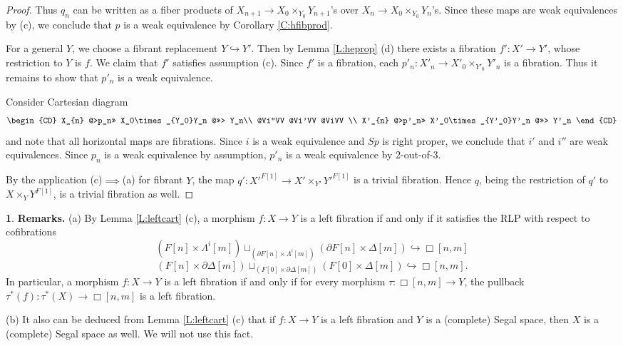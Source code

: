\documentclass[12pt]{amsart}
\theoremstyle{plain}
\theoremstyle{definition}
\newtheorem{Emp}[Thm]{}
\numberwithin{equation}{section}
\newcommand{\La}{\Lambda}
\newcommand{\hra}{\hookrightarrow}
\newcommand{\Dt}{\Delta}
\newcommand{\rl}[1]{Lemma \ref{L:#1}}
\newcommand{\rco}[1]{Corollary \ref{C:#1}}
\begin{document}
\begin{proof}
Thus $q_n$ can be written as a fiber products of $X_{n+1}\to
X_0\times_{Y_0}Y_{n+1}$'s over $X_n\to X_0\times_{Y_0}Y_n$'s. Since
these maps are weak equivalences by (c), we conclude that $p$ is a
weak equivalence by \rco{hfibprod}.

For a general $Y$, we choose a fibrant replacement $Y\hra Y'$. Then
by \rl{heprop} (d) there exists a fibration $f':X'\to Y'$, whose
restriction to $Y$ is $f$. We claim that $f'$ satisfies assumption
(c). Since $f'$ is a fibration, each  $p'_n:X'_{n}\to
X'_0\times_{Y'_0}Y'_{n}$ is a fibration. Thus it remains to show
that $p'_n$ is a weak equivalence.

Consider Cartesian diagram
\[
\begin{CD}
X_{n} @>p_n>> X_0\times_{Y_0}Y_n @>>> Y_n\\
@Vi''VV @Vi'VV   @ViVV   \\
X'_{n} @>p'_n>> X'_0\times_{Y'_0}Y'_n @>>> Y'_n
\end{CD}
\]
and note that all horizontal maps are fibrations. Since $i$ is a
weak equivalence and $Sp$ is right proper, we conclude that $i'$
and $i''$ are weak equivalences. Since $p_n$ is a weak equivalence
by assumption, $p'_n$ is a weak equivalence by 2-out-of-3.

By the application (c)$\implies$(a) for fibrant $Y$, the map $q':X'^{F[1]}\to
X'\times_{Y'} Y'^{F[1]}$ is a trivial fibration. Hence $q$, being
the restriction of $q'$ to $X\times_{Y} Y^{F[1]}$, is a trivial
fibration as well.
\end{proof}

\begin{Emp} \label{E:left}
{\bf Remarks.} (a) By \rl{leftcart} (c), a morphism  $f:X\to Y$ is
a left fibration if and only if it satisfies the RLP with respect to cofibrations 
\[
(F[n]\times\La^i[m])\sqcup_{(\partial
F[n]\times\La^i[m])}(\partial F[n]\times\Dt[m])\hra\Box[n,m]\]
\[(F[n]\times\partial\Dt[m])\sqcup_{(F[0]\times\partial\Dt[m])}
(F[0]\times\Dt[m])\hra\Box[n,m].\] In particular, a
morphism $f:X\to Y$ is a left fibration if and only if for every
morphism $\tau:\Box[n,m]\to Y$, the pullback
$\tau^*(f):\tau^*(X)\to\Box[n,m]$ is a left fibration.

(b) It also can be deduced from \rl{leftcart} (c) that if $f:X\to
Y$ is a left fibration and $Y$ is a (complete) Segal space, then
$X$ is a (complete) Segal space as well. We will not use this
fact.
\end{Emp}
\end{document}
